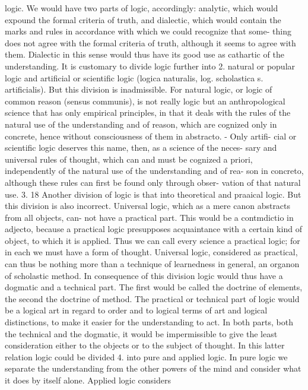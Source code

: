 logic.
We would have two parts of logic, accordingly: analytic, which would
expound the formal criteria of truth, and dialectic, which would contain the
marks and rules in accordance with which we could recognize that some-
thing does not agree with the formal criteria of truth, although it seems to
agree with them. Dialectic in this sense would thus have its good use as
cathartic of the understanding.
It is customary to divide logic further into
2.
natural or popular logic and artificial or scientific logic (logica naturalis, log.
scholastica s. artificialis).
But this division is inadmissible. For natural logic, or logic of common
reason (sensus communis), is not really logic but an anthropological science
that has only empirical principles, in that it deals with the rules of the
natural use of the understanding and of reason, which are cognized only
in concrete, hence without consciousness of them in abstracto. - Only artifi-
cial or scientific logic deserves this name, then, as a science of the neces-
sary and universal rules of thought, which can and must be cognized a
priori, independently of the natural use of the understanding and of rea-
son in concreto, although these rules can first be found only through obser-
vation of that natural use.
3.
18
Another division of logic is that into theoretical and praaical logic. But this
division is also incorrect.
Universal logic, which as a mere canon abstracts from all objects, can-
not have a practical part. This would be a contmdictio in adjecto, because a
practical logic presupposes acquaintance with a certain kind of object, to
which it is applied. Thus we can call every science a practical logic; for in
each we must have a form of thought. Universal logic, considered as
practical, can thus be nothing more than a technique of learnedness in
general, an organon of scholastic method.
In consequence of this division logic would thus have a dogmatic and a
technical part. The first would be called the doctrine of elements, the second
the doctrine of method. The practical or technical part of logic would be a
logical art in regard to order and to logical terms of art and logical
distinctions, to make it easier for the understanding to act.
In both parts, both the technical and the dogmatic, it would be
impermissible to give the least consideration either to the objects or to the
subject of thought. In this latter relation logic could be divided
4.
into pure and applied logic.
In pure logic we separate the understanding from the other powers of
the mind and consider what it does by itself alone. Applied logic considers
